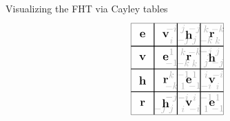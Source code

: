 \documentclass[8pt, handout]{beamer}
\begin{document}
\begin{frame}{Visualizing the FHT via Cayley tables}
\[\begin{tikzpicture}[scale=.42]
\begin{scope}[shift={(14,0)}]
      \node at (3.5,1.5) {$-j$};
      \node at (4.5,8.5) {$-i$};
      \node at (4.5,7.5) {$i$};
      \node at (4.5,6.5) {$1$};
      \node at (4.5,5.5) {$-1$}; 
      \node at (4.5,4.5) {$k$}; 
      \node at (4.5,3.5) {$-k$};
      \node at (4.5,2.5) {$-j$};
      \node at (4.5,1.5) {$j$};
      \node at (5.5,8.5) {$j$};
      \node at (5.5,7.5) {$-j$};
      \node at (5.5,6.5) {$k$};
      \node at (5.5,5.5) {$-k$}; 
      \node at (5.5,4.5) {$-1$}; 
      \node at (5.5,3.5) {$1$};
      \node at (5.5,2.5) {$-i$};
      \node at (5.5,1.5) {$i$};
      \node at (6.5,8.5) {$-j$};
      \node at (6.5,7.5) {$j$};
      \node at (6.5,6.5) {$-k$};
      \node at (6.5,5.5) {$k$}; 
      \node at (6.5,4.5) {$1$}; 
      \node at (6.5,3.5) {$-1$};
      \node at (6.5,2.5) {$i$};
      \node at (6.5,1.5) {$-i$};
      \node at (7.5,8.5) {$k$};
      \node at (7.5,7.5) {$-k$};
      \node at (7.5,6.5) {$-j$};
      \node at (7.5,5.5) {$j$}; 
      \node at (7.5,4.5) {$i$}; 
      \node at (7.5,3.5) {$-i$};
      \node at (7.5,2.5) {$-1$};
      \node at (7.5,1.5) {$1$};
      \node at (8.5,8.5) {$-k$};
      \node at (8.5,7.5) {$k$};
      \node at (8.5,6.5) {$j$};
      \node at (8.5,5.5) {$-j$}; 
      \node at (8.5,4.5) {$-i$}; 
      \node at (8.5,3.5) {$i$};
      \node at (8.5,2.5) {$1$};
      \node at (8.5,1.5) {$-1$};
      \filldraw[fill=white,opacity=0.7] 
      (1,1)--(9,1)--(9,9)--(1,9)--cycle;
      \draw[thick] (3,1)--(3,9);
      \draw[thick] (5,1)--(5,9);
      \draw[thick] (7,1)--(7,9); 
      \draw[thick] (1,3)--(9,3);
      \draw[thick] (1,5)--(9,5);
      \draw[thick] (1,7)--(9,7);
      \node at (2,8) {\large\bf $\mathbf{e}$};
      \node at (4,8) {\large\bf $\mathbf{v}$};
      \node at (6,8) {\large\bf $\mathbf{h}$};
      \node at (8,8) {\large\bf $\mathbf{r}$};
      \node at (2,6) {\large\bf $\mathbf{v}$};
      \node at (4,6) {\large\bf $\mathbf{e}$};
      \node at (6,6) {\large\bf $\mathbf{r}$};
      \node at (8,6) {\large\bf $\mathbf{h}$};
      \node at (2,4) {\large\bf $\mathbf{h}$};
      \node at (4,4) {\large\bf $\mathbf{r}$};
      \node at (6,4) {\large\bf $\mathbf{e}$};
      \node at (8,4) {\large\bf $\mathbf{v}$};
      \node at (2,2) {\large\bf $\mathbf{r}$};
      \node at (4,2) {\large\bf $\mathbf{h}$};
      \node at (6,2) {\large\bf $\mathbf{v}$};
      \node at (8,2) {\large\bf $\mathbf{e}$};
    \end{scope}
  \end{tikzpicture}
  \]
  
\end{frame}
\end{document}
